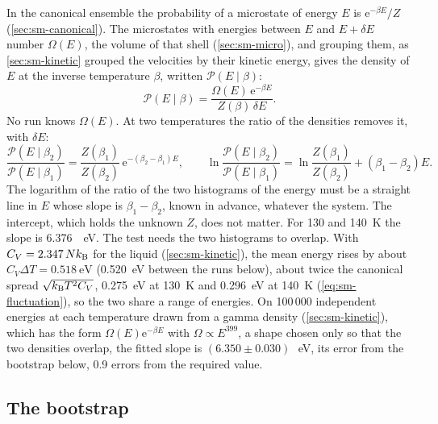 In the canonical ensemble the probability of a microstate of energy $E$
is $\mathrm{e}^{-\beta E}/Z$ (\cref{sec:sm-canonical}). The microstates
with energies between $E$ and $E + \delta E$ number $\Omega(E)$, the
volume of that shell (\cref{sec:sm-micro}), and grouping them, as
\cref{sec:sm-kinetic} grouped the velocities by their kinetic energy,
gives the density of $E$ at the inverse temperature $\beta$, written
$\mathcal{P}(E \mid \beta)$:
\begin{equation*}
   \mathcal{P}(E \mid \beta) = \frac{\Omega(E)\,\mathrm{e}^{-\beta E}}
   {Z(\beta)\,\delta E} .
\end{equation*}
No run knows $\Omega(E)$. At two temperatures the ratio of the densities
removes it, with $\delta E$:
\begin{equation*}
   \frac{\mathcal{P}(E \mid \beta_2)}{\mathcal{P}(E \mid \beta_1)}
   = \frac{Z(\beta_1)}{Z(\beta_2)}\,\mathrm{e}^{-(\beta_2 - \beta_1)E} ,
   \qquad
   \ln\frac{\mathcal{P}(E \mid \beta_2)}{\mathcal{P}(E \mid \beta_1)}
   = \ln\frac{Z(\beta_1)}{Z(\beta_2)} + (\beta_1 - \beta_2)E .
\end{equation*}
The logarithm of the ratio of the two histograms of the energy must be a
straight line in $E$ whose slope is $\beta_1 - \beta_2$, known in advance,
whatever the system. The intercept, which holds the unknown $Z$, does not
matter. For 130 and \SI{140}{\kelvin} the slope is
\SI{6.376}{\per\electronvolt}. The test needs the two histograms to
overlap. With $C_V = 2.347\,Nk_{\mathrm{B}}$ for the liquid (\cref{sec:sm-kinetic}),
the mean energy rises by about $C_V\Delta T = \SI{0.518}{\electronvolt}$
(\SI{0.520}{\electronvolt} between the runs below), about twice the
canonical spread $\sqrt{k_{\mathrm{B}} T^2C_V}$, \SI{0.275}{\electronvolt} at
\SI{130}{\kelvin} and \SI{0.296}{\electronvolt} at \SI{140}{\kelvin}
(\cref{eq:sm-fluctuation}), so the two share a range of energies. On
100\,000 independent energies at each temperature drawn from a gamma
density (\cref{sec:sm-kinetic}), which has the form $\Omega(E)\mathrm{e}^{-\beta
E}$ with $\Omega \propto E^{399}$, a shape chosen only so that the two
densities overlap, the fitted slope is $(6.350 \pm
0.030)$\,\si{\per\electronvolt}, its error from the bootstrap below, 0.9
errors from the required value.

\subsection*{The bootstrap}


